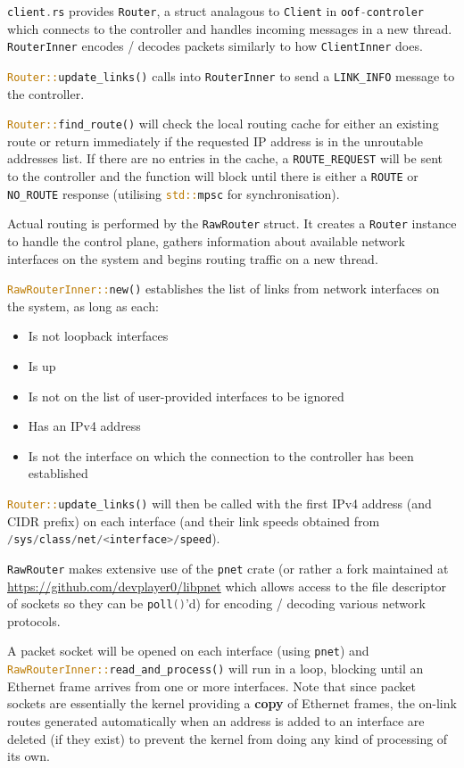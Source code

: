 \documentclass[a4paper]{article}
\numberwithin{figure}{section}
\numberwithin{table}{section}
\newcommand{\mi}{\mintinline}
\begin{document}
\mi{c}{client.rs} provides \mi{rust}{Router}, a struct analagous to \mi{rust}{Client} in \mi{c}{oof-controler} which connects to the controller and handles incoming messages in a new thread. \mi{rust}{RouterInner} encodes / decodes packets similarly to how \mi{rust}{ClientInner} does.

\mi{rust}{Router::update_links()} calls into \mi{rust}{RouterInner} to send a \mi{c}{LINK_INFO} message to the controller.

\mi{rust}{Router::find_route()} will check the local routing cache for either an existing route or return immediately if the requested IP address is in the unroutable addresses list. If there are no entries in the cache, a \mi{c}{ROUTE_REQUEST} will be sent to the controller and the function will block until there is either a \mi{c}{ROUTE} or \mi{c}{NO_ROUTE} response (utilising \mi{rust}{std::mpsc} for synchronisation).

\medskip
\noindent Actual routing is performed by the \mi{rust}{RawRouter} struct. It creates a \mi{rust}{Router} instance to handle the control plane, gathers information about available network interfaces on the system and begins routing traffic on a new thread.

\mi{rust}{RawRouterInner::new()} establishes the list of links from network interfaces on the system, as long as each:
\begin{itemize}
	\item Is not loopback interfaces
	\item Is up
	\item Is not on the list of user-provided interfaces to be ignored
	\item Has an IPv4 address
	\item Is not the interface on which the connection to the controller has been established
\end{itemize}

\mi{rust}{Router::update_links()} will then be called with the first IPv4 address (and CIDR prefix) on each interface (and their link speeds obtained from \mi{c}{/sys/class/net/<interface>/speed}).

\mi{rust}{RawRouter} makes extensive use of the \mi{rust}{pnet} crate (or rather a fork maintained at \url{https://github.com/devplayer0/libpnet} which allows access to the file descriptor of sockets so they can be \mi{c}{poll()}'d) for encoding / decoding various network protocols.

A packet socket will be opened on each interface (using \mi{rust}{pnet}) and \mi{rust}{RawRouterInner::read_and_process()} will run in a loop, blocking until an Ethernet frame arrives from one or more interfaces. Note that since packet sockets are essentially the kernel providing a \textbf{copy} of Ethernet frames, the on-link routes generated automatically when an address is added to an interface are deleted (if they exist) to prevent the kernel from doing any kind of processing of its own.
\end{document}
